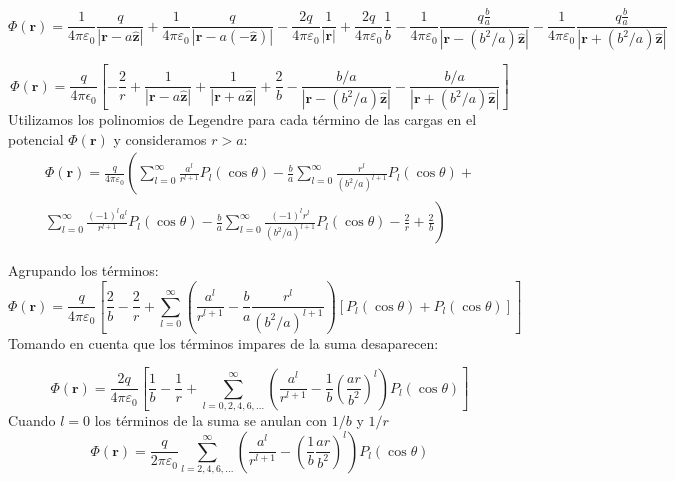 \documentclass{article}
\begin{document}
\begin{equation} 
\Phi(\mathbf{r}) = \frac{1}{4\pi\varepsilon_0} \frac{q}{|\mathbf{r} - a \mathbf{\hat{z}}|}  +
\frac{1}{4\pi\varepsilon_0} \frac{q}{|\mathbf{r} - a (-\mathbf{\hat{z}})|} - \frac{2q}{4\pi\varepsilon_0}\frac{1}{|\mathbf{r}|} +  \frac{2q}{4\pi\varepsilon_0}\frac{1}{b} - \frac{1}{4\pi \varepsilon_0}\frac{q\frac{b}{a}}{|\mathbf{r} - (b^2/a)\mathbf{\hat{z}}|} - \frac{1}{4\pi \varepsilon_0}\frac{q\frac{b}{a}}{|\mathbf{r} + (b^2/a)\mathbf{\hat{z}}|}
\end{equation}

\begin{equation}
    \Phi(\mathbf{r}) = \frac{q}{4\pi\epsilon_0} \left [ -\frac{2}{r} + \frac{1}{|\mathbf{r} - a \mathbf{\hat{z}}|} + \frac{1}{|\mathbf{r} + a \mathbf{\hat{z}}|} + \frac{2}{b} - 
    \frac{b/a}{|\mathbf{r} - (b^2/a) \mathbf{\hat{z}}|} - \frac{b/a}{|\mathbf{r} + (b^2/a) \mathbf{\hat{z}}|}
    \right] 
\end{equation}
Utilizamos los polinomios de Legendre para cada término de las cargas en el potencial $\Phi(\mathbf{r})$ y consideramos $r > a$:
\begin{equation}
\begin{split}
    \Phi(\mathbf{r}) = \frac{q}{4\pi\varepsilon_0}
    \left (\sum_{l=0}^{\infty}\frac{a^l}{r^{l+1}}P_l(\cos \theta) -
    \frac{b}{a}\sum_{l=0}^{\infty}\frac{r^l}{(b^2/a)^{l+1}}P_l(\cos \theta) + \right .\\ 
    \left . \sum_{l=0}^{\infty} \frac{(-1)^l a^l}{r^{l+1}}P_l(\cos \theta) -\frac{b}{a}\sum_{l=0}^{\infty} \frac{(-1)^l r^l}{(b^2/a)^{l+1}}P_l(\cos \theta) - \frac{2}{r} + \frac{2}{b} \right)
\end{split}
\end{equation}

Agrupando los términos:
\begin{equation}
    \Phi(\mathbf{r}) = \frac{q}{4\pi\varepsilon_0} \left[ \frac{2}{b} - \frac{2}{r}+ \sum_{l=0}^{\infty} \left (\frac{a^l}{r^{l+1}} - \frac{b}{a}\frac{r^l}{(b^2/a)^{l+1}}  \right ) [P_l(\cos \theta) + P_l(\cos\theta)] \right]
\end{equation}
Tomando en cuenta que los términos impares de la suma desaparecen:

\begin{equation}
    \Phi(\mathbf{r}) = \frac{2q}{4\pi\varepsilon_0} \left[\frac{1}{b} - \frac{1}{r} + \sum_{l = 0, 2, 4, 6, ...}^{\infty} \left( \frac{a^l}{r^{l+1}} - \frac{1}{b}\left (\frac{ar}{b^2}\right )^l \right) P_l(\cos\theta)   \right]
\end{equation}
Cuando $l = 0$ los términos de la suma se anulan con $1/b$ y $1/r$
\begin{equation}
    \Phi(\mathbf{r}) = \frac{q}{2\pi\varepsilon_0} \sum_{l = 2, 4, 6, ...}^{\infty} \left( \frac{a^l}{r^{l+1}} - \left( \frac{1}{b}\frac{ar}{b^2}\right)^l \right)P_l(\cos\theta)
\end{equation}
\end{document}
